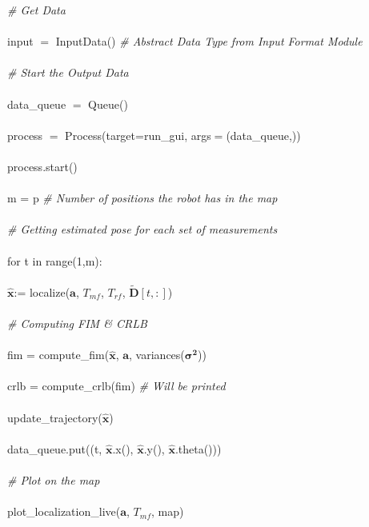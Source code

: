 \documentclass[12pt, titlepage]{article}
\begin{document}
\noindent \textit{\# Get Data}\\\\
\noindent input $=$ InputData() \textit{\# Abstract Data Type from Input Format Module}\\\\
\noindent \textit{\# Start the Output Data}\\\\
\noindent data\_queue $=$ Queue()\\\\
\noindent process $=$ Process(target=run\_gui, args$=$(data\_queue,))\\\\
\noindent process.start()\\\\
\noindent m = p \textit{\# Number of positions the robot has in the map}\\\\
\noindent \textit{\# Getting estimated pose for each set of measurements}\\\\
\noindent for t in range(1,m): \\\\
\indent $\mathbf{\hat{x}}$:= localize($\mathbf{a}$, $T_{mf}$, $T_{rf}$, $\mathbf{\tilde{D}}[t,:]$)\\\\
\indent \textit{\# Computing FIM \& CRLB} \\\\
\indent  fim = compute\_fim($\mathbf{\hat{x}}$, $\mathbf{a}$, variances($\boldsymbol{\sigma^2}$))\\\\
\indent  crlb = compute\_crlb(fim) \textit{\# Will be printed}\\\\
\indent update\_trajectory($\mathbf{\hat{x}}$)\\\\
\indent data\_queue.put((t, $\mathbf{\hat{x}}$.x(), $\mathbf{\hat{x}}$.y(), $\mathbf{\hat{x}}$.theta()))\\\\
\noindent \textit{\# Plot on the map}\\\\
\noindent plot\_localization\_live($\mathbf{a}$, $T_{mf}$, map)

\end{document}
